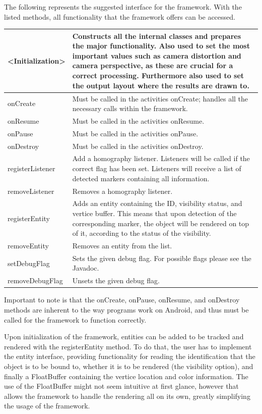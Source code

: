 The following represents the suggested interface for the framework.
With the listed methods, all functionality that the framework offers can be accessed.

{\footnotesize
\begin{tabulary}{\textwidth}{J || J}
<Initialization> & Constructs all the internal classes and prepares the major functionality. Also used to set the most important values such as camera distortion and camera perspective, as these are crucial for a correct processing. Furthermore also used to set the output layout where the results are drawn to.\\
\hline
onCreate & Must be called in the activities onCreate; handles all the necessary calls within the framework.\\
\hline
onResume & Must be called in the activities onResume.\\
\hline
onPause & Must be called in the activities onPause.\\
\hline
onDestroy & Must be called in the activities onDestroy.\\
\hline
registerListener & Add a homography listener. Listeners will be called if the correct flag has been set. Listeners will receive a list of detected markers containing all information.\\
\hline
removeListener & Removes a homography listener. \\
\hline
registerEntity & Adds an entity containing the ID, visibility status, and vertice buffer. This means that upon detection of the corresponding marker, the object will be rendered on top of it, according to the status of the visibility.\\
\hline
removeEntity & Removes an entity from the list.\\
\hline
setDebugFlag & Sets the given debug flag. For possible flags please see the Javadoc.\\
\hline
removeDebugFlag & Unsets the given debug flag.\\
\end{tabulary}
}

Important to note is that the onCreate, onPause, onResume, and onDestroy methods are inherent to the way programs work on Android, and thus must be called for the framework to function correctly.

Upon initialization of the framework, entities can be added to be tracked and rendered with the registerEntity method.
To do that, the user has to implement the entity interface, providing functionality for reading the identification that the object is to be bound to, whether it is to be rendered (the visibility option), and finally a FloatBuffer containing the vertice location and color information.
The use of the FloatBuffer might not seem intuitive at first glance, however that allows the framework to handle the rendering all on its own, greatly simplifying the usage of the framework.

